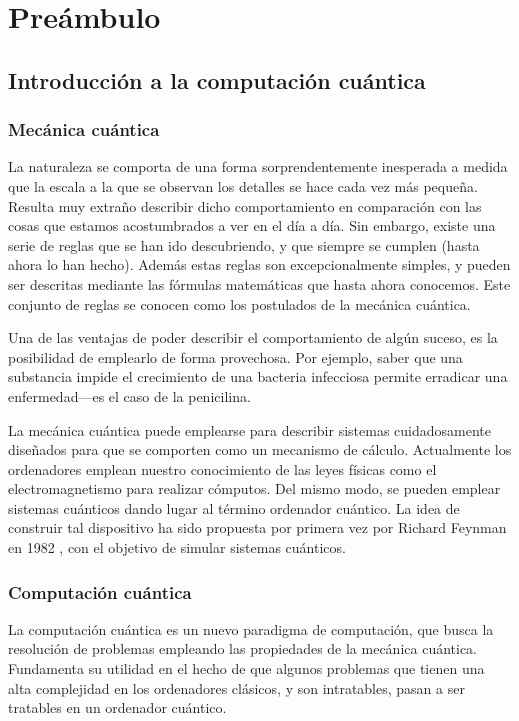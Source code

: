 \chapter{Preámbulo}
\section{Introducción a la computación cuántica}

\subsection{Mecánica cuántica}
La naturaleza se comporta de una forma sorprendentemente inesperada a medida que 
la escala a la que se observan los detalles se hace cada vez más pequeña.  
Resulta muy extraño describir dicho comportamiento en comparación con las cosas 
que estamos acostumbrados a ver en el día a día. Sin embargo, existe una serie 
de reglas que se han ido descubriendo, y que siempre se cumplen (hasta ahora lo 
han hecho). Además estas reglas son excepcionalmente simples, y pueden ser 
descritas mediante las fórmulas matemáticas que hasta ahora conocemos. Este 
conjunto de reglas se conocen como los postulados de la mecánica cuántica.

Una de las ventajas de poder describir el comportamiento de algún suceso, es la 
posibilidad de emplearlo de forma provechosa. Por ejemplo, saber que una 
substancia impide el crecimiento de una bacteria infecciosa permite erradicar 
una enfermedad---es el caso de la penicilina.

La mecánica cuántica puede emplearse para describir sistemas cuidadosamente 
diseñados para que se comporten como un mecanismo de cálculo. Actualmente los 
ordenadores emplean nuestro conocimiento de las leyes físicas como el 
electromagnetismo para realizar cómputos. Del mismo modo, se pueden emplear 
sistemas cuánticos dando lugar al término ordenador cuántico. La idea de 
construir tal dispositivo ha sido propuesta por primera vez por Richard Feynman 
en 1982 \cite{feynman-sim}, con el objetivo de simular sistemas cuánticos.

\subsection{Computación cuántica}
La computación cuántica es un nuevo paradigma de computación, que busca la
resolución de problemas empleando las propiedades de la mecánica cuántica.
Fundamenta su utilidad en el hecho de que algunos problemas que tienen una alta
complejidad en los ordenadores clásicos, y son intratables, pasan a ser
tratables en un ordenador cuántico.

